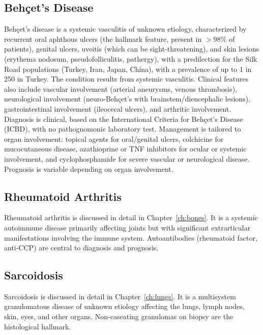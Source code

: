 \subsection{Behçet's Disease}
\label{sec:Behçet's Disease}
Behçet's disease is a systemic vasculitis of unknown etiology, characterized by recurrent oral aphthous ulcers (the hallmark feature, present in $>$98\% of patients), genital ulcers, uveitis (which can be sight-threatening), and skin lesions (erythema nodosum, pseudofolliculitis, pathergy), with a predilection for the Silk Road populations (Turkey, Iran, Japan, China), with a prevalence of up to 1 in 250 in Turkey. The condition results from systemic vasculitis. Clinical features also include vascular involvement (arterial aneurysms, venous thrombosis), neurological involvement (neuro-Behçet's with brainstem/diencephalic lesions), gastrointestinal involvement (ileocecal ulcers), and arthritic involvement. Diagnosis is clinical, based on the International Criteria for Behçet's Disease (ICBD), with no pathognomonic laboratory test. Management is tailored to organ involvement: topical agents for oral/genital ulcers, colchicine for mucocutaneous disease, azathioprine or TNF inhibitors for ocular or systemic involvement, and cyclophosphamide for severe vascular or neurological disease. Prognosis is variable depending on organ involvement.

\subsection{Rheumatoid Arthritis}
\label{sec:Rheumatoid Arthritis (Immune)}
Rheumatoid arthritis is discussed in detail in Chapter~\ref{ch:bones}. It is a systemic autoimmune disease primarily affecting joints but with significant extrarticular manifestations involving the immune system. Autoantibodies (rheumatoid factor, anti-CCP) are central to diagnosis and prognosis.

\subsection{Sarcoidosis}
\label{sec:lymph:Sarcoidosis}
Sarcoidosis is discussed in detail in Chapter~\ref{ch:lungs}. It is a multisystem granulomatous disease of unknown etiology affecting the lungs, lymph nodes, skin, eyes, and other organs. Non-caseating granulomas on biopsy are the histological hallmark.

